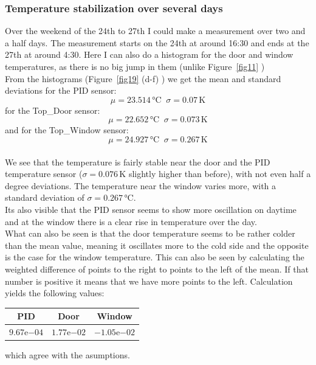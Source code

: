 \documentclass[12pt]{scrartcl}
\begin{document}
      \subsubsection{Temperature stabilization over several days}
      Over the weekend of the 24th to 27th I could make a measurement over two
      and a half days. The measurement starts on the 24th at around 16:30 and
      ends at the 27th at around 4:30. Here I can also do a histogram for the
      door and window temperatures, as there is no big jump in them (unlike
      Figure~\ref{fig11} )\\
      From the histograms (Figure~\ref{fig19} (d-f) ) we get the mean and standard deviations for the PID
      sensor: $$\mu = 23.514\,\text{°C} \;\; \sigma = 0.07\,\text{K}$$
      for the Top\_Door sensor: $$\mu = 22.652\,\text{°C} \;\; \sigma = 0.073\,\text{K}$$
      and for the Top\_Window sensor: $$\mu = 24.927\,\text{°C} \;\;
      \sigma = 0.267\,\text{K}$$ \\
      We see that the temperature is fairly stable near the door and the PID
      temperature sensor ($\sigma = 0.076 \,\text{K}$ slightly higher than before), with
      not even half a degree deviations. The temperature near the window varies
      more, with a standard deviation of $\sigma = 0.267\,\text{°C}$.\\
      Its also visible that the PID sensor seems to show more oscillation on
      daytime and at the window there is a clear rise in temperature over the day.
      \\What can also be seen is that the door temperature seems to be rather
      colder than the mean value, meaning it oscillates more to the cold side
      and the opposite is the case for the window temperature. This can also be
      seen by calculating the weighted difference of points to the right to
      points to the left of the mean. If that number is positive it means that
      we have more points to the left.
      Calculation yields the following values: \vspace{-5pt}
      \begin{table}[H]
        \begin{tabular}{c | c | c}
          PID & Door & Window \\
          \hline
          $9.67\mathrm{e}{-04}$ & $1.77\mathrm{e}{-02}$ & $-1.05\mathrm{e}{-02}$
        \end{tabular}
      \end{table}
      \vspace{-5pt} which agree with the asumptions.
\end{document}
